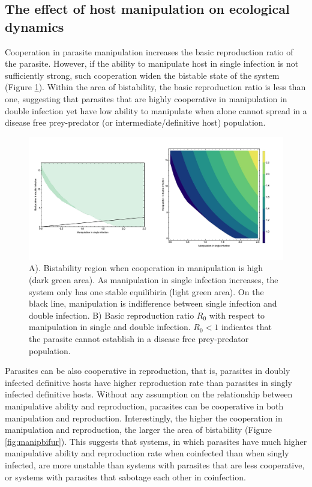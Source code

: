 \documentclass[11pt]{article}
\begin{document}
\subsection*{The effect of host manipulation on ecological dynamics}


Cooperation in parasite manipulation increases the basic reproduction ratio of the parasite. However, if the ability to manipulate host in single infection is not sufficiently strong, such cooperation widen the bistable state of the system (Figure \ref{fig:manipR0}). Within the area of bistability, the basic reproduction ratio is less than one, suggesting that parasites that are highly cooperative in manipulation in double infection yet have low ability to manipulate when alone cannot spread in a disease free prey-predator (or intermediate/definitive host) population. 

\begin{figure}
\includegraphics[width=\textwidth]{Figures/manip_bifur_R0.jpeg}
\caption{A). Bistability region when cooperation in manipulation is high (dark green area). As manipulation in single infection increases, the system only has one stable equilibiria (light green area). On the black line, manipulation is indifference between single infection and double infection. B) Basic reproduction ratio $R_0$ with respect to manipulation in single and double infection. $R_0 < 1$ indicates that the parasite cannot establish in a disease free prey-predator population.}
\label{fig:manipR0}
\end{figure}

Parasites can be also cooperative in reproduction, that is, parasites in doubly infected definitive hosts have higher reproduction rate than parasites in singly infected definitive hosts. Without any assumption on the relationship between manipulative ability and reproduction, parasites can be cooperative in both manipulation and reproduction. Interestingly, the higher the cooperation in manipulation and reproduction, the larger the area of bistability (Figure \ref{fig:manipbifur}). This suggests that systems, in which parasites have much higher manipulative ability and reproduction rate when coinfected than when singly infected, are more unstable than systems with parasites that are less cooperative, or systems with parasites that sabotage each other in coinfection. \cite{akbari:ACSSynBio:2014}
\end{document}
